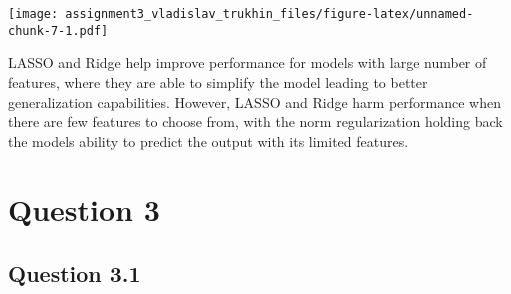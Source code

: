 \documentclass[
]{article}
\begin{document}
\texttt{[image: assignment3\_vladislav\_trukhin\_files/figure-latex/unnamed-chunk-7-1.pdf]}

LASSO and Ridge help improve performance for models with large number of
features, where they are able to simplify the model leading to better
generalization capabilities. However, LASSO and Ridge harm performance
when there are few features to choose from, with the norm regularization
holding back the models ability to predict the output with its limited
features.

\hypertarget{question-3}{%
\section{Question 3}\label{question-3}}

\hypertarget{question-3.1}{%
\subsection{Question 3.1}\label{question-3.1}}
\end{document}
